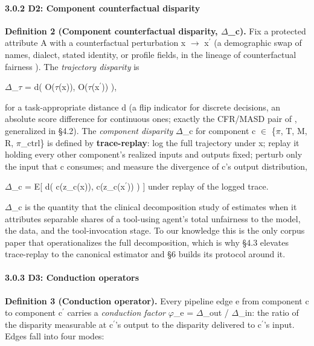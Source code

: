 \documentclass[10pt]{article}
\begin{document}
\paragraph*{3.0.2 D2: Component counterfactual disparity}

\textbf{Definition 2 (Component counterfactual disparity, $\Delta$\_c).} Fix a protected attribute A with a counterfactual perturbation x $\rightarrow$ x$^{\prime}$ (a demographic swap of names, dialect, stated identity, or profile fields, in the lineage of counterfactual fairness \cite{kusner2017counterfactual}). The \emph{trajectory disparity} is

$\Delta$\_$\tau$ = d( O($\tau$(x)), O($\tau$(x$^{\prime}$)) ),

for a task-appropriate distance d (a flip indicator for discrete decisions, an absolute score difference for continuous ones; exactly the CFR/MASD pair of \cite{mayilvaghanan2026counterfactual}, generalized in \S{}4.2). The \emph{component disparity} $\Delta$\_c for component c $\in$ \{$\pi$, T, M, R, $\pi$\_ctrl\} is defined by \textbf{trace-replay}: log the full trajectory under x; replay it holding every other component's realized inputs and outputs fixed; perturb only the input that c consumes; and measure the divergence of c's output distribution,

$\Delta$\_c = E[ d( c(z\_c(x)), c(z\_c(x$^{\prime}$)) ) ] under replay of the logged trace.

$\Delta$\_c is the quantity that the clinical decomposition study of \cite{xu2026ducx} estimates when it attributes separable shares of a tool-using agent's total unfairness to the model, the data, and the tool-invocation stage. To our knowledge this is the only corpus paper that operationalizes the full decomposition, which is why \S{}4.3 elevates trace-replay to the canonical estimator and \S{}6 builds its protocol around it.

\paragraph*{3.0.3 D3: Conduction operators}

\textbf{Definition 3 (Conduction operator).} Every pipeline edge e from component c to component c$^{\prime}$ carries a \emph{conduction factor} $\varphi$\_e = $\Delta$\_out / $\Delta$\_in: the ratio of the disparity measurable at c$^{\prime}$'s output to the disparity delivered to c$^{\prime}$'s input. Edges fall into four modes:
\end{document}
